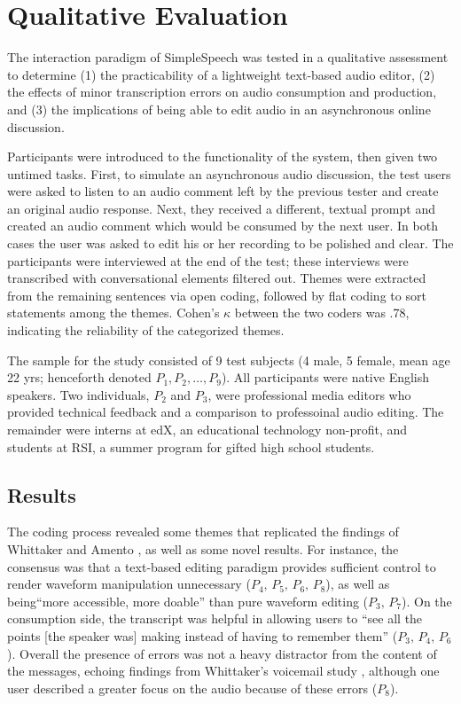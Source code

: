 \section{Qualitative Evaluation}

The interaction paradigm of SimpleSpeech was tested in a qualitative assessment to determine (1) the practicability of a lightweight text-based audio editor, (2) the effects of minor transcription errors on audio consumption and production, and (3) the implications of being able to edit audio in an asynchronous online discussion.

Participants were introduced to the functionality of the system, then given two untimed tasks. 
First, to simulate an asynchronous audio discussion, the test users were asked to listen to an audio comment left by the previous tester and create an original audio response. 
Next, they received a different, textual prompt and created an audio comment which would be consumed by the next user. 
In both cases the user was asked to edit his or her recording to be polished and clear.
The participants were interviewed at the end of the test; these interviews were transcribed with conversational elements filtered out.
Themes were extracted from the remaining sentences via open coding, followed by flat coding to sort statements among the themes. 
Cohen's $\kappa$ between the two coders was .78, indicating the reliability of the categorized themes.

The sample for the study consisted of 9 test subjects (4 male, 5 female, mean age 22 yrs; henceforth denoted $P_1, P_2, \ldots, P_9$). 
All participants were native English speakers. 
Two individuals, $P_2$ and $P_3$, were professional media editors who provided technical feedback and a comparison to professoinal audio editing.
The remainder were interns at edX, an educational technology non-profit, and students at RSI, a summer program for gifted high school students.

\subsection{Results}
The coding process revealed some themes that replicated the findings of Whittaker and Amento \cite{whittaker_semantic}, as well as some novel results.
For instance, the consensus was that a text-based editing paradigm provides sufficient control to render waveform manipulation unnecessary ($P_4,\,P_5,\,P_6,\,P_8$), as well as being``more accessible, more doable'' than pure waveform editing ($P_3,\,P_7$).
On the consumption side, the transcript was helpful in allowing users to ``see all the points [the speaker was] making instead of having to remember them'' ($P_3,\,P_4,\,P_6$).
Overall the presence of errors was not a heavy distractor from the content of the messages, echoing findings from Whittaker's voicemail study \cite{whittaker}, although one user described a greater focus on the audio because of these errors ($P_8$).

